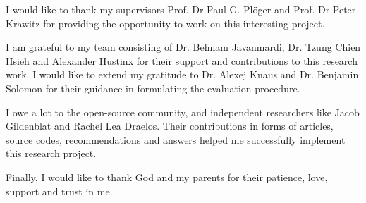 \documentclass[../report.tex]{subfiles}
\begin{document}
    \begin{acknowledgements}
     I would like to thank my supervisors Prof. Dr Paul G. Plöger and Prof. Dr Peter Krawitz for
     providing the opportunity to work on this interesting project.
     
     
     I am grateful to my team consisting of Dr. Behnam Javanmardi, Dr. Tzung Chien Hsieh and  Alexander Hustinx for their support and contributions to this research work. I would like to extend my gratitude to Dr. Alexej Knaus and Dr. Benjamin Solomon for their guidance in formulating the evaluation procedure. 
     
     I owe a lot to the open-source community, and independent researchers like Jacob Gildenblat and Rachel Lea Draelos. Their contributions in forms of articles, source codes, recommendations and answers helped me successfully implement this research project.  
     
     Finally, I would like to thank God and my parents for their patience, love, support and trust in me.
    \end{acknowledgements}
\end{document}
